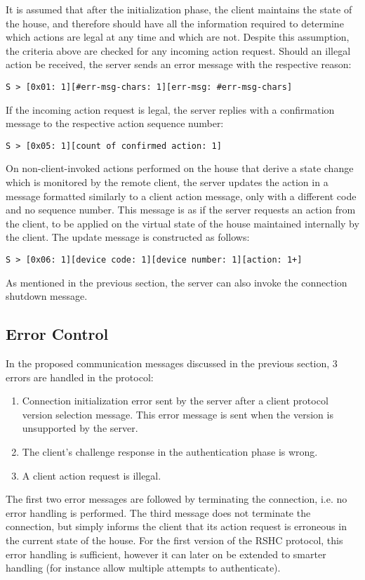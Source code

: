It is assumed that after the initialization phase, the client maintains the state of the house, and therefore should have all the information required to determine which actions are legal at any time and which are not. Despite this assumption, the criteria above are checked for any incoming action request. Should an illegal action be received, the server sends an error message with the respective reason:

\begin{verbatim}
S > [0x01: 1][#err-msg-chars: 1][err-msg: #err-msg-chars]
\end{verbatim}

\noindent
If the incoming action request is legal, the server replies with a confirmation message to the respective action sequence number:

\begin{verbatim}
S > [0x05: 1][count of confirmed action: 1]
\end{verbatim}

\noindent
On non-client-invoked actions performed on the house that derive a state change which is monitored by the remote client, the server updates the action in a message formatted similarly to a client action message, only with a different code and no sequence number. This message is as if the server requests an action from the client, to be applied on the virtual state of the house maintained internally by the client. The update message is constructed as follows:

\begin{verbatim}
S > [0x06: 1][device code: 1][device number: 1][action: 1+]
\end{verbatim}

\noindent
As mentioned in the previous section, the server can also invoke the connection shutdown message.


\subsection{Error Control}
\label{sec:pdus:err}

In the proposed communication messages discussed in the previous section, 3 errors are handled in the protocol:
\begin{enumerate}
\item Connection initialization error sent by the server after a client protocol version selection message. This error message is sent when the version is unsupported by the server.
\item The client's challenge response in the authentication phase is wrong.
\item A client action request is illegal.
\end{enumerate}

The first two error messages are followed by terminating the connection, i.e. no error handling is performed. The third message does not terminate the connection, but simply informs the client that its action request is erroneous in the current state of the house. For the first version of the RSHC protocol, this error handling is sufficient, however it can later on be extended to smarter handling (for instance allow multiple attempts to authenticate).


